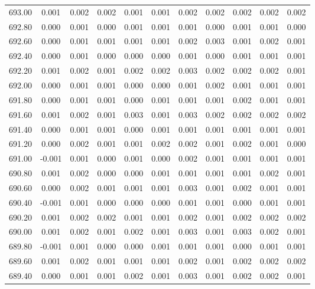 \begin{longtable}{cccccccccc}
    693.00 &  0.001 &  0.002 &  0.002 &  0.001 &  0.001 &  0.002 &  0.002 &  0.002 &  0.002 &  0.002 \\
    692.80 &  0.000 &  0.001 &  0.000 &  0.001 &  0.001 &  0.001 &  0.000 &  0.001 &  0.001 &  0.000 \\
    692.60 &  0.000 &  0.001 &  0.001 &  0.001 &  0.001 &  0.002 &  0.003 &  0.001 &  0.002 &  0.001 \\
    692.40 &  0.000 &  0.001 &  0.000 &  0.000 &  0.000 &  0.001 &  0.000 &  0.001 &  0.001 &  0.001 \\
    692.20 &  0.001 &  0.002 &  0.001 &  0.002 &  0.002 &  0.003 &  0.002 &  0.002 &  0.002 &  0.001 \\
    692.00 &  0.000 &  0.001 &  0.001 &  0.000 &  0.000 &  0.001 &  0.002 &  0.001 &  0.001 &  0.001 \\
    691.80 &  0.000 &  0.001 &  0.001 &  0.000 &  0.001 &  0.001 &  0.001 &  0.002 &  0.001 &  0.001 \\
    691.60 &  0.001 &  0.002 &  0.001 &  0.003 &  0.001 &  0.003 &  0.002 &  0.002 &  0.002 &  0.002 \\
    691.40 &  0.000 &  0.001 &  0.001 &  0.000 &  0.001 &  0.001 &  0.001 &  0.001 &  0.001 &  0.001 \\
    691.20 &  0.000 &  0.002 &  0.001 &  0.001 &  0.002 &  0.002 &  0.001 &  0.002 &  0.001 &  0.000 \\
    691.00 & -0.001 &  0.001 &  0.000 &  0.001 &  0.000 &  0.002 &  0.001 &  0.001 &  0.001 &  0.001 \\
    690.80 &  0.001 &  0.002 &  0.000 &  0.000 &  0.001 &  0.001 &  0.001 &  0.001 &  0.002 &  0.001 \\
    690.60 &  0.000 &  0.002 &  0.001 &  0.001 &  0.001 &  0.003 &  0.001 &  0.002 &  0.001 &  0.001 \\
    690.40 & -0.001 &  0.001 &  0.000 &  0.000 &  0.000 &  0.001 &  0.001 &  0.000 &  0.001 &  0.001 \\
    690.20 &  0.001 &  0.002 &  0.002 &  0.001 &  0.001 &  0.002 &  0.001 &  0.002 &  0.002 &  0.002 \\
    690.00 &  0.001 &  0.002 &  0.001 &  0.002 &  0.001 &  0.003 &  0.001 &  0.003 &  0.002 &  0.001 \\
    689.80 & -0.001 &  0.001 &  0.000 &  0.000 &  0.001 &  0.001 &  0.001 &  0.000 &  0.001 &  0.001 \\
    689.60 &  0.001 &  0.002 &  0.001 &  0.001 &  0.001 &  0.002 &  0.001 &  0.002 &  0.002 &  0.002 \\
    689.40 &  0.000 &  0.001 &  0.001 &  0.002 &  0.001 &  0.003 &  0.001 &  0.002 &  0.002 &  0.001 \\

\end{longtable}
